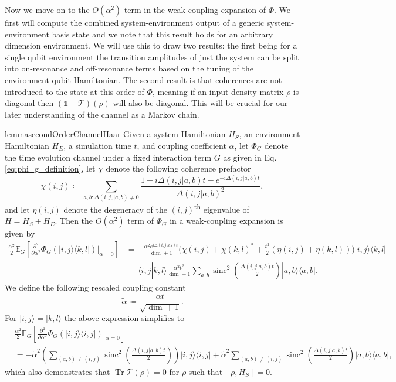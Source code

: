 \documentclass{article}
\newcommand{\ket}[1]{|#1\rangle}
\newcommand{\braket}[2]{\langle #1|#2\rangle}
\newcommand{\ketbra}[2]{| #1\rangle\! \langle #2|}
\newcommand{\ts}{\textsuperscript}
\DeclareMathOperator{\Tr}{Tr}
\newcommand{\identity}{\mathds{1}}
\DeclareMathOperator{\sinc}{sinc}
\begin{document}
Now we move on to the $O(\alpha^2)$ term in the weak-coupling expansion of $\Phi$. We first will compute the combined system-environment output of a generic system-environment basis state and we note that this result holds for an arbitrary dimension environment. We will use this to draw two results:  the first being for a single qubit environment the transition amplitudes of just the system can be split into on-resonance and off-resonance terms based on the tuning of the environment qubit Hamiltonian. The second result is that coherences are not introduced to the state at this order of $\Phi$, meaning if an input density matrix $\rho$ is diagonal then $(\identity + \mathcal{T})(\rho)$ will also be diagonal. This will be crucial for our later understanding of the channel as a Markov chain.
\begin{restatable}{lemma}{secondOrderChannelHaar} \label{lem:big_one}
    Given a system Hamiltonian $H_{S}$, an environment Hamiltonian $H_{E}$, a simulation time $t$, and coupling coefficient $\alpha$, let $\Phi_G$ denote the time evolution channel under a fixed interaction term $G$ as given in Eq. \eqref{eq:phi_g_definition}, let $\chi$ denote the following coherence prefactor
$$ \chi(i,j) \coloneqq \sum_{a,b: \Delta(i,j,|a,b) \neq 0} \frac{1 - i \Delta(i,j|a,b)t - e^{-i \Delta(i,j|a,b) t}}{\Delta(i,j|a,b)^2}, $$
and let $\eta(i,j)$ denote the degeneracy of the $(i,j)$\ts{th} eigenvalue of $H = H_S + H_E$. Then the $O(\alpha^2)$ term of $\Phi_G$ in a weak-coupling expansion is given by
 \begin{align}
 \frac{\alpha^2}{2} \mathbb{E}_G \left[ \frac{\partial^2}{\partial \alpha^2} \Phi_G(\ketbra{i,j}{k,l}) \big|_{\alpha = 0} \right] &= -\frac{\alpha^2  e^{i \Delta(i,j|k,l) t}}{\dim + 1} \bigg(\chi(i,j) + \chi(k,l)^*  + \frac{t^2}{2}(\eta(i,j) + \eta(k,l)) \bigg) \ketbra{i,j}{k,l} \nonumber \\
    &~ + \braket{i,j}{k,l}  \frac{\alpha^2 t^2}{\dim+1} \sum_{a,b} \sinc^2 \left( \frac{\Delta(i,j|a,b)t}{2} \right) \ketbra{a,b}{a,b}.  \label{eq:el_gigante}
 \end{align}
 We define the following rescaled coupling constant 
 \begin{equation}
    \widetilde{\alpha} \coloneqq \frac{\alpha t}{\sqrt{\dim + 1}}. \label{eq:a_tilde_def}
\end{equation}
 For $\ket{i, j} = \ket{k, l}$ the above expression simplifies to
 \begin{align}
     &\frac{\alpha^2}{2} \mathbb{E}_G \left[ \frac{\partial^2}{\partial \alpha^2} \Phi_G(\ketbra{i,j}{i,j}) \big|_{\alpha = 0} \right] \nonumber \\
     &=  - \widetilde{\alpha}^2 \left(\sum_{(a,b) \neq (i,j)} \sinc^2 \left(\frac{\Delta(i,j | a,b)t}{2} \right) \right) \ketbra{i, j}{i,j} + \widetilde{\alpha}^2 \sum_{(a,b) \neq (i,j)} \sinc^2 \left(\frac{\Delta(i,j | a,b)t}{2} \right) \ketbra{a, b}{a,b} ,\label{eq:el_gigante_dos}
 \end{align}
 which also demonstrates that $\Tr \mathcal{T}(\rho) = 0$ for $\rho$ such that $[\rho, H_S] = 0$.
\end{restatable}
\end{document}
